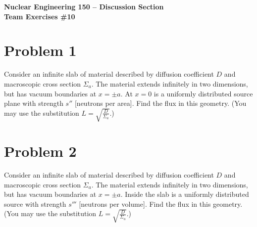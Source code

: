 \documentclass{report}
\begin{document}
\begin{center}
\textbf{\large Nuclear Engineering 150 -- Discussion Section}\\ 
\textbf{Team Exercises \#10}
\end{center}

\section*{Problem 1}

Consider an infinite slab of material described by diffusion coefficient $D$ and macroscopic cross section $\Sigma_a$. The material extends infinitely in two dimensions, but has vacuum boundaries at $x=\pm a$. At $x=0$ is a uniformly distributed source plane with strength $s''$ [neutrons per area]. Find the flux in this geometry. (You may use the substitution $L = \sqrt{\frac{D}{\Sigma_a}}$.)


\newpage
\section*{Problem 2}

Consider an infinite slab of material described by diffusion coefficient $D$ and macroscopic cross section $\Sigma_a$. The material extends infinitely in two dimensions, but has vacuum boundaries at $x=\pm a$. Inside the slab is a uniformly distributed source with strength $s'''$ [neutrons per volume]. Find the flux in this geometry. (You may use the substitution $L = \sqrt{\frac{D}{\Sigma_a}}$.)
\end{document}
